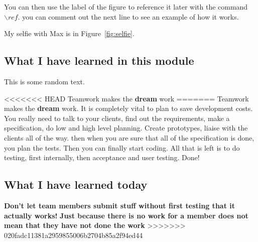 You can then use the label of the figure to reference it later with the command ${\backslash}ref$. you can comment out the next line to see an example of how it works.

My selfie with Max is in  Figure~\ref{fig:selfie}.

\subsection{What I have learned in this module}
This is some random text.

<<<<<<< HEAD
Teamwork makes the \textbf{dream} work
=======
Teamwork makes the \textbf{dream} work. It is completely vital to plan to save development costs. You really need to talk to your clients, find out the requirements, make a specification, do low and high level planning. Create prototypes, liaise with the clients all of the way. then when you are sure that all of the specification is done, you plan the tests. Then you can finally start coding. All that is left is to do testing, first internally, then acceptance and user testing. Done!

\subsection{What I have learned today}

\textbf{Don't let team members submit stuff without first testing that it actually works!}
\textbf{Just because there is no work for a member does not mean that they have not done the work}
>>>>>>> 020fadc11381a2959855006b2704b85a2f94ed44
